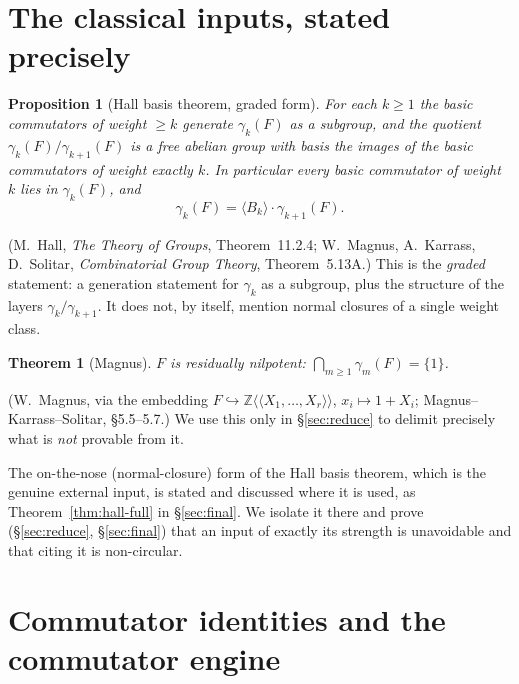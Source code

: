 \documentclass{amsart}
\newtheorem{theorem}{Theorem}
\newtheorem{proposition}{Proposition}
\theoremstyle{definition}
\theoremstyle{remark}
\begin{document}
\section{The classical inputs, stated precisely}\label{sec:input}

\begin{proposition}[Hall basis theorem, graded form]\label{prop:hall}
For each $k\ge 1$ the basic commutators of weight $\ge k$ generate $\gamma_k(F)$
\emph{as a subgroup}, and the quotient $\gamma_k(F)/\gamma_{k+1}(F)$ is a free
abelian group with basis the images of the basic commutators of weight exactly
$k$. In particular every basic commutator of weight $k$ lies in $\gamma_k(F)$, and
\begin{equation}\label{eq:hall-decomp}
\gamma_k(F)=\langle B_k\rangle\cdot\gamma_{k+1}(F).
\end{equation}
\end{proposition}

\noindent
(M.\ Hall, \emph{The Theory of Groups}, Theorem~11.2.4; W.\ Magnus, A.\ Karrass,
D.\ Solitar, \emph{Combinatorial Group Theory}, Theorem~5.13A.) This is the
\emph{graded} statement: a generation statement for $\gamma_k$ as a subgroup, plus
the structure of the layers $\gamma_k/\gamma_{k+1}$. It does not, by itself,
mention normal closures of a single weight class.

\begin{theorem}[Magnus]\label{thm:magnus}
$F$ is residually nilpotent: $\bigcap_{m\ge1}\gamma_m(F)=\{1\}$.
\end{theorem}

\noindent
(W.\ Magnus, via the embedding $F\hookrightarrow\mathbb Z\langle\!\langle
X_1,\dots,X_r\rangle\!\rangle$, $x_i\mapsto 1+X_i$; Magnus--Karrass--Solitar,
\S5.5--5.7.) We use this only in \S\ref{sec:reduce} to delimit precisely what is
\emph{not} provable from it.

\noindent
The on-the-nose (normal-closure) form of the Hall basis theorem, which is the
genuine external input, is stated and discussed where it is used, as
Theorem~\ref{thm:hall-full} in \S\ref{sec:final}. We isolate it there and prove
(\S\ref{sec:reduce}, \S\ref{sec:final}) that an input of exactly its strength is
unavoidable and that citing it is non-circular.

\section{Commutator identities and the commutator engine}\label{sec:engine}
\end{document}
